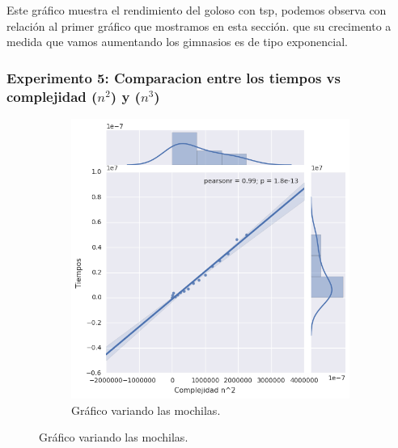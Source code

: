 Este gráfico muestra el rendimiento del goloso con tsp, podemos observa con relación al primer gráfico que mostramos en esta sección.
que su crecimento a medida que vamos aumentando los gimnasios es de tipo exponencial.

\subsubsection{Experimento 5: Comparacion entre los tiempos vs complejidad ($n^2$) y ($n^3$) }

\begin{figure}[H]
  \begin{center}	
    \begin{subfigure}[b]{0.60\textwidth}
        \includegraphics[width=\textwidth]{img/ejercicio2/losPosta/pearsonncuadrado.png}
        \caption{Gráfico variando las mochilas.}
        \label{fig: ejercicio1_ejemplo_camino1_2}
 \end{subfigure}
 

\end{center}
\end{figure}
